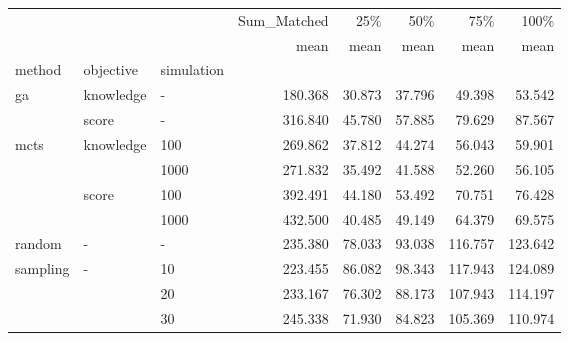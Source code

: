 \begin{tabular}{lllrrrrr}
\toprule
         &   &    & Sum\_Matched &    25\% &    50\% &     75\% &    100\% \\
         &   &    &        mean &   mean &   mean &    mean &    mean \\
method & objective & simulation &             &        &        &         &         \\
\midrule
ga & knowledge & - &     180.368 & 30.873 & 37.796 &  49.398 &  53.542 \\
         & score & - &     316.840 & 45.780 & 57.885 &  79.629 &  87.567 \\
mcts & knowledge & 100 &     269.862 & 37.812 & 44.274 &  56.043 &  59.901 \\
         &   & 1000 &     271.832 & 35.492 & 41.588 &  52.260 &  56.105 \\
         & score & 100 &     392.491 & 44.180 & 53.492 &  70.751 &  76.428 \\
         &   & 1000 &     432.500 & 40.485 & 49.149 &  64.379 &  69.575 \\
random & - & - &     235.380 & 78.033 & 93.038 & 116.757 & 123.642 \\
sampling & - & 10 &     223.455 & 86.082 & 98.343 & 117.943 & 124.089 \\
         &   & 20 &     233.167 & 76.302 & 88.173 & 107.943 & 114.197 \\
         &   & 30 &     245.338 & 71.930 & 84.823 & 105.369 & 110.974 \\
\bottomrule
\end{tabular}
